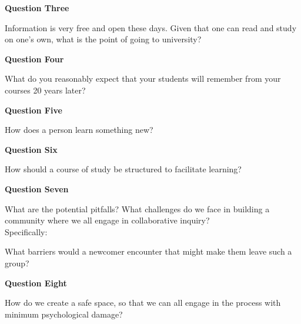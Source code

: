 \documentclass[10pt,handout]{beamer}
\begin{document}
\begin{frame}{\textbf{Question Three}}

\begin{center}{\Huge Information is very free and open these days. Given that one can read and study on one's own, what is the point of going to university?}\end{center}

\end{frame}


\begin{frame}{\textbf{Question Four}}

\begin{center}{\Huge What do you reasonably expect that your students will remember from your courses 20 years later?}\end{center}

\end{frame}

\begin{frame}{\textbf{Question Five}}

\begin{center}{\Huge How does a person learn something new?}\end{center}

\end{frame}

\begin{frame}{\textbf{Question Six}}

\begin{center}{\Huge How should a course of study be structured to facilitate learning?}\end{center}

\end{frame}

\begin{frame}{\textbf{Question Seven}}

{\Large
What are the potential pitfalls? What challenges do we face in building a community where we all engage in collaborative inquiry?}\\[.5in]

Specifically:
\begin{center}{\Huge What barriers would a newcomer encounter that might make them leave such a group?}\end{center}

\end{frame}

\begin{frame}{\textbf{Question Eight}}

\begin{center}{\Huge How do we create a safe space, so that we can all engage in the process with minimum psychological damage?}\end{center}

\end{frame}
\end{document}
